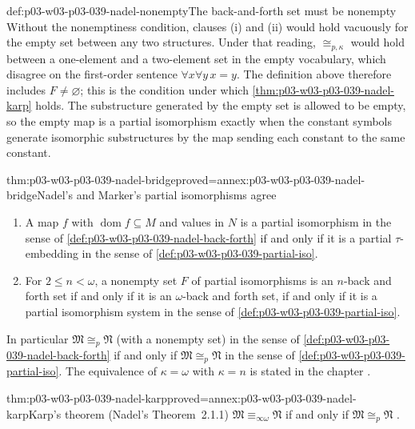 \begin{hbwarning}{def:p03-w03-p03-039-nadel-nonempty}{The back-and-forth set must be nonempty}
Without the nonemptiness condition, clauses (i) and (ii) would hold
vacuously for the empty set between any two structures. Under that reading,
\(\cong_{p,\kappa}\) would hold between a one-element and a two-element set
in the empty vocabulary, which disagree on the first-order sentence
\(\forall x\forall y\,x=y\). The definition above therefore includes
\(F\ne\varnothing\); this is the condition under which
\cref{thm:p03-w03-p03-039-nadel-karp} holds. The substructure generated by
the empty set is allowed to be empty, so the empty map is a partial
isomorphism exactly when the constant symbols generate isomorphic
substructures by the map sending each constant to the same constant.
\end{hbwarning}

\begin{hblemma}{thm:p03-w03-p03-039-nadel-bridge}{proved=annex:p03-w03-p03-039-nadel-bridge}{Nadel's and Marker's partial isomorphisms agree}
\begin{enumerate}
\item A map \(f\) with \(\operatorname{dom}f\subseteq M\) and values in
      \(N\) is a partial isomorphism in the sense of
      \cref{def:p03-w03-p03-039-nadel-back-forth} if and only if it is a
      partial \(\tau\)-embedding in the sense of
      \cref{def:p03-w03-p03-039-partial-iso}.
\item For \(2\le n<\omega\), a nonempty set \(F\) of partial isomorphisms is
      an \(n\)-back and forth set if and only if it is an \(\omega\)-back and
      forth set, if and only if it is a partial isomorphism system in the
      sense of \cref{def:p03-w03-p03-039-partial-iso}.
\end{enumerate}
In particular \(\mathfrak M\cong_p\mathfrak N\) (with a nonempty set) in the
sense of \cref{def:p03-w03-p03-039-nadel-back-forth} if and only if
\(\mathfrak M\cong_p\mathfrak N\) in the sense of
\cref{def:p03-w03-p03-039-partial-iso}. The equivalence of \(\kappa=\omega\)
with \(\kappa=n\) is stated in the chapter \cite[p.~276]{Nadel1985Admissible}.
\end{hblemma}

\begin{hbtheorem}{thm:p03-w03-p03-039-nadel-karp}{proved=annex:p03-w03-p03-039-nadel-karp}{Karp's theorem (Nadel's Theorem~2.1.1)}
\(\mathfrak M\equiv_{\infty\omega}\mathfrak N\) if and only if
\(\mathfrak M\cong_p\mathfrak N\)
\cite[Thm.~2.1.1, p.~277]{Nadel1985Admissible}.
\end{hbtheorem}

